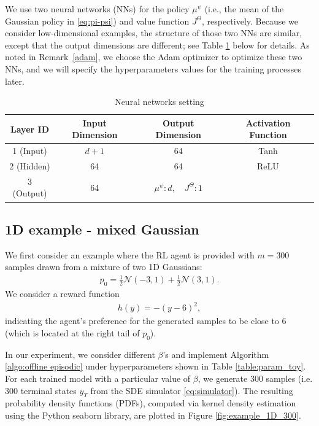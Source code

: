 \documentclass[11pt]{article}
\begin{document}
\begin{itemize}
	
	We use two neural networks (NNs) for the policy $\mu^\psi$ (i.e., the mean of the Gaussian policy in \eqref{eq:pi-psi}) and value function $J^\Theta$, respectively. Because we consider low-dimensional examples, the structure of those two NNs are similar, except that the output dimensions are different; see Table \ref{table:NN_setting} below for details. As noted in Remark~\ref{adam}, we choose the Adam optimizer  to optimize these two NNs, and we will specify the hyperparameters values for the training processes later.

	\begin{table}[H]
		\centering
		\begin{tabular}{c | c c c}
			\hline Layer ID & Input Dimension & Output Dimension & Activation Function\\
			\hline 1 (Input) & $d + 1$ &  64 & Tanh\\
			2 (Hidden) & 64 & 64 & ReLU\\				
			3 (Output) & 64 & $\mu^\psi: d,\quad J^\Theta: 1$\\ \hline
		\end{tabular}
		\captionsetup{justification=centering}
		\caption{Neural networks setting}
		\label{table:NN_setting}
	\end{table}


\end{itemize}

\subsection{1D example - mixed Gaussian}
We first consider an example where the RL agent is provided with $m=300$ samples drawn from a mixture of two 1D Gaussians: %
\begin{align*}
p_0 = \frac{1}{2} \mathcal{N}(-3, 1) + \frac{1}{2} \mathcal{N}(3, 1).
\end{align*}
We consider a reward function
\begin{align}\label{eq:h-1}
	h(y)= - (y - 6)^2,
\end{align}
 indicating the agent's preference for the generated samples to be close to $6$ (which is located at the right tail of $p_0$).



In our experiment, we consider different $\beta$'s and implement Algorithm \ref{algo:offline episodic} under hyperparameters shown in Table \ref{table:param_toy}. For each trained model with a particular value of $\beta$, we generate 300 samples (i.e. 300 terminal states $y_T$ from the SDE simulator \eqref{eq:simulator}). The resulting probability density functions (PDFs), computed via kernel density estimation using the Python seaborn library, are plotted in Figure \ref{fig:example_1D_300}.
\end{document}
